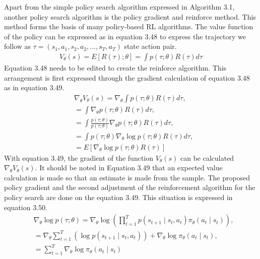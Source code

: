\documentclass[12pt,twoside,a4]{mwbk}
\begin{document}
\noindent Apart from the simple policy search algorithm expressed in Algorithm 3.1, another policy search algorithm is the policy gradient and reinforce method. This method forms the basis of many policy-based RL algorithms. The value function of the policy can be expressed as in equation 3.48 to express the trajectory we follow as $\tau=\left(s_{1}, a_{1}, s_{2}, a_{2}, \ldots, s_{T}, a_{T}\right)$ state action pair.
\begin{subequations}
\begin{align}
   V_{\theta}(s)=E[R(\tau) ; \theta]=\int p(\tau ; \theta) R(\tau) d \tau
\end{align}
\end{subequations}
Equation 3.48 needs to be edited to create the reinforce algorithm. This arrangement is first expressed through the gradient calculation of equation 3.48 as in equation 3.49.
\begin{subequations}
\begin{align}
   &\nabla_{\theta} V_{\theta}(s)=\nabla_{\theta} \int p(\tau ; \theta) R(\tau) d \tau, \\
&=\int \nabla_{\theta} p(\tau ; \theta) R(\tau) d \tau, \\
&=\int \frac{p(\tau ; \theta)}{p(\tau ; \theta)} \nabla_{\theta} p(\tau ; \theta) R(\tau) d \tau, \\
&=\int p(\tau ; \theta) \nabla_{\theta} \log p(\tau ; \theta) R(\tau) d \tau, \\
&=E\left[\nabla_{\theta} \log p(\tau ; \theta) R(\tau)\right]
\end{align}
\end{subequations}
With equation 3.49, the gradient of the function $V_{\theta}(s)$ can be calculated $\nabla_{\theta} V_{\theta}(s)$. It should be noted in Equation 3.49 that an expected value calculation is made so that an estimate is made from the sample. The proposed policy gradient and the second adjustment of the reinforcement algorithm for the policy search are done on the equation 3.49. This situation is expressed in equation 3.50.
\begin{subequations}
\begin{align}
   &\nabla_{\theta} \log p(\tau ; \theta)=\nabla_{\theta} \log \left(\prod_{t=1}^{T} p\left(s_{t+1} \mid s_{t}, a_{t}\right) \pi_{\theta}\left(a_{t} \mid s_{t}\right)\right), \\
&=\nabla_{\theta} \sum_{t=1}^{T}\left(\log p\left(s_{t+1} \mid s_{t}, a_{t}\right)\right)+\nabla_{\theta} \log \pi_{\theta}\left(a_{t} \mid s_{t}\right), \\
&=\sum_{t=1}^{T} \nabla_{\theta} \log \pi_{\theta}\left(a_{t} \mid s_{t}\right)
\end{align}
\end{subequations}
\end{document}
